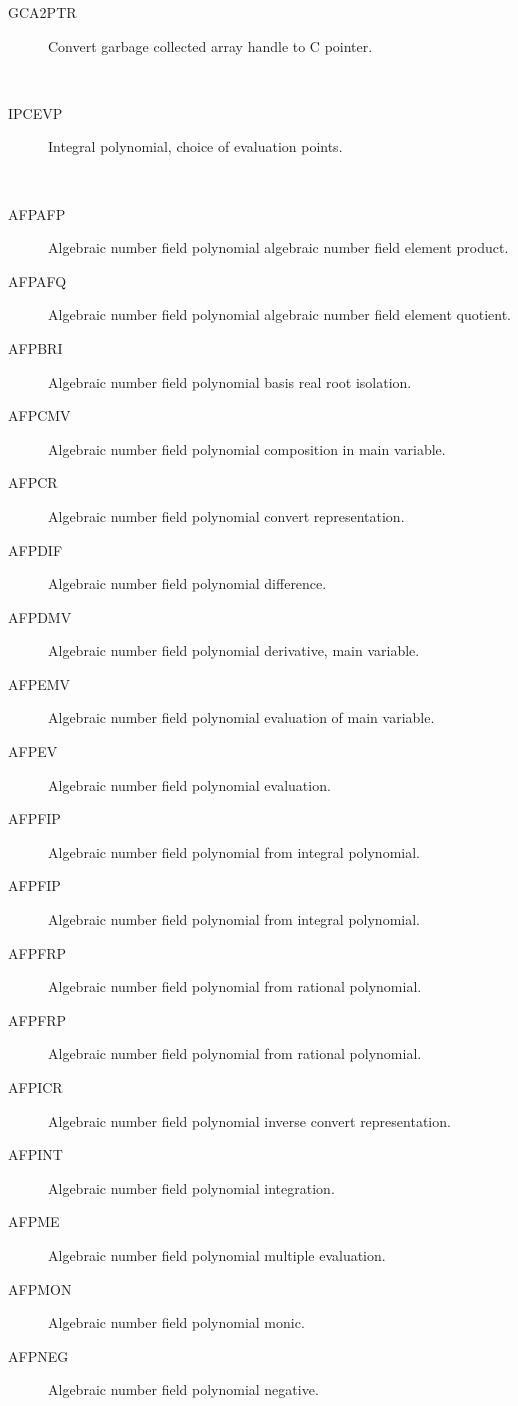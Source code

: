 \begin{description}
\begin{description}
  \item[GCA2PTR]  Convert garbage collected array handle to C pointer.
  \end{description}
\item[points] \ \ 
  \begin{description}
  \item[IPCEVP]  Integral polynomial, choice of evaluation points.
  \end{description}
\item[polynomial] \ \ 
  \begin{description}
  \item[AFPAFP]  Algebraic number field polynomial algebraic number field
    element product.
  \item[AFPAFQ]  Algebraic number field polynomial algebraic number field
    element quotient.
  \item[AFPBRI]  Algebraic number field polynomial basis real root isolation.
  \item[AFPCMV]  Algebraic number field polynomial composition in main
    variable.
  \item[AFPCR]  Algebraic number field polynomial convert representation.
  \item[AFPDIF]  Algebraic number field polynomial difference.
  \item[AFPDMV]  Algebraic number field polynomial derivative, main variable.
  \item[AFPEMV]  Algebraic number field polynomial evaluation of main
    variable.
  \item[AFPEV]  Algebraic number field polynomial evaluation.
  \item[AFPFIP]  Algebraic number field polynomial from integral polynomial.
  \item[AFPFIP]  Algebraic number field polynomial from integral polynomial.
  \item[AFPFRP]  Algebraic number field polynomial from rational polynomial.
  \item[AFPFRP]  Algebraic number field polynomial from rational polynomial.
  \item[AFPICR]  Algebraic number field polynomial inverse convert
    representation.
  \item[AFPINT]  Algebraic number field polynomial integration.
  \item[AFPME]  Algebraic number field polynomial multiple evaluation.
  \item[AFPMON]  Algebraic number field polynomial monic.
  \item[AFPNEG]  Algebraic number field polynomial negative.

\end{description}
\end{description}
